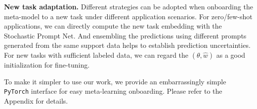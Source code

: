 \documentclass[nohyperref]{article}
\theoremstyle{plain}
\theoremstyle{definition}
\theoremstyle{remark}
\newcommand{\metaflo}{\texttt{Meta-FLO} }
\newcommand{\tnew}{\text{new}}
\newcommand{\told}{\text{old}}
\begin{document}


{\bf New task adaptation.} Different strategies can be adopted when onboarding the meta-model to a new task under different application scenarios. For zero/few-shot applications, we can directly compute the new task embedding with the Stochastic Prompt Net. And ensembling the predictions using different prompts generated from the same support data helps to establish prediction uncertainties. For new tasks with sufficient labeled data, we can regard the $(\theta, \hat{w})$ as a good initialization for fine-tuning. 


To make it simpler to use our work, we provide an embarrassingly simple \texttt{PyTorch} interface for easy meta-learning onboarding. Please refer to the Appendix for details. 


%
%
\end{document}
